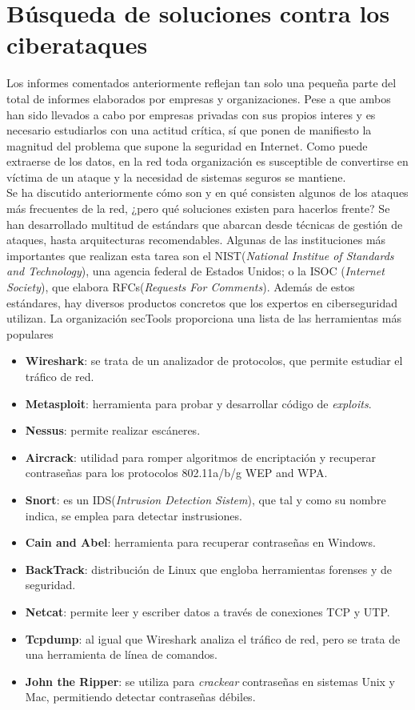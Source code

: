 \section{Búsqueda de soluciones contra los ciberataques}
Los informes comentados anteriormente reflejan tan solo una pequeña parte del total de informes elaborados por empresas y organizaciones. Pese a que ambos han sido llevados a cabo por empresas privadas con sus propios interes y es necesario estudiarlos con una actitud crítica, sí que ponen de manifiesto la magnitud del problema que supone la seguridad en Internet. Como puede extraerse de los datos, en la red toda organización es susceptible de convertirse en víctima de un ataque y la necesidad de sistemas seguros se mantiene.\\ 
Se ha discutido anteriormente cómo son y en qué consisten algunos de los ataques más frecuentes de la red, ¿pero qué soluciones existen para hacerlos frente? Se han desarrollado multitud de estándars que abarcan desde técnicas de gestión de ataques, hasta arquitecturas recomendables. Algunas de las instituciones más importantes que realizan esta tarea son el NIST(\textit{National Institue of Standards and Technology}), una agencia federal de Estados Unidos; o la ISOC (\textit{Internet Society}), que elabora RFCs(\textit{Requests For Comments})\cite{Stallings2016}. Además de estos estándares, hay diversos productos concretos que los expertos en ciberseguridad utilizan. La organización secTools proporciona una lista de las herramientas más populares\cite{secTools}
\begin{itemize}
	\item \textbf{Wireshark}: se trata de un analizador de protocolos, que permite estudiar el tráfico de red.
	\item \textbf{Metasploit}: herramienta para probar y desarrollar código de \textit{exploits}.
	\item \textbf{Nessus}: permite realizar escáneres.
	\item \textbf{Aircrack}: utilidad para romper algoritmos de encriptación y recuperar contraseñas para los protocolos 802.11a/b/g WEP and WPA.
	\item \textbf{Snort}: es un IDS(\textit{Intrusion Detection Sistem}), que tal y como su nombre indica, se emplea para detectar instrusiones.
	\item \textbf{Cain and Abel}: herramienta para recuperar contraseñas en Windows.
	\item \textbf{BackTrack}: distribución de Linux que engloba herramientas forenses y de seguridad.
	\item \textbf{Netcat}: permite leer y escriber datos a través de conexiones TCP y UTP.
	\item \textbf{Tcpdump}: al igual que Wireshark analiza el tráfico de red, pero se trata de una herramienta de línea de comandos.
	\item \textbf{John the Ripper}: se utiliza para \textit{crackear} contraseñas en sistemas Unix y Mac, permitiendo detectar contraseñas débiles.
\end{itemize}
